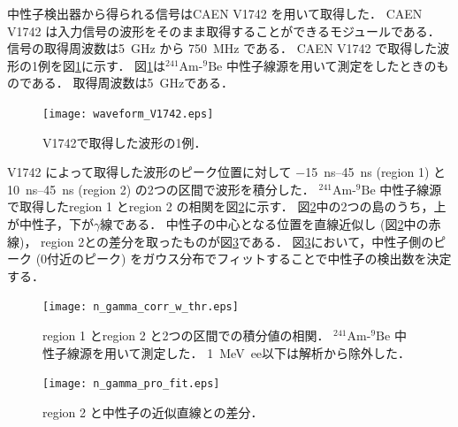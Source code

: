 \documentclass[../master]{subfiles}
\begin{document}
中性子検出器から得られる信号はCAEN V1742 を用いて取得した．
CAEN V1742 は入力信号の波形をそのまま取得することができるモジュールである．
信号の取得周波数は\SI{5}{\giga\hertz} から \SI{750}{\mega\hertz} である．
CAEN V1742 で取得した波形の1例を図\ref{fig::waveform_V1742}に示す．
図\ref{fig::waveform_V1742}は${}^{241}\mathrm{Am}$-${}^{9}\mathrm{Be}$ 中性子線源を用いて測定をしたときのものである．
取得周波数は\SI{5}{\giga\hertz}である．
\begin{figure}
  \centering
  \texttt{[image: waveform\_V1742.eps]}
  \caption{V1742で取得した波形の1例．}
  \label{fig::waveform_V1742}
\end{figure}

V1742 によって取得した波形のピーク位置に対して
\SIrange{-15}{45}{\nano\second} (region 1) と\SIrange{10}{45}{\nano\second} (region 2) の2つの区間で波形を積分した．
${}^{241}\mathrm{Am}$-${}^{9}\mathrm{Be}$ 中性子線源で取得したregion 1 とregion 2 の相関を図\ref{fig::n_gamma_correlation}に示す．
図\ref{fig::n_gamma_correlation}中の2つの島のうち，上が中性子，下が$\gamma$線である．
中性子の中心となる位置を直線近似し (図\ref{fig::n_gamma_correlation}中の赤線)，
region 2との差分を取ったものが図\ref{fig::n_gamma_projection}である．
図\ref{fig::n_gamma_projection}において，中性子側のピーク (0付近のピーク)
をガウス分布でフィットすることで中性子の検出数を決定する．
\begin{figure}
  \centering
  \texttt{[image: n\_gamma\_corr\_w\_thr.eps]}
  \caption[region 1 とregion 2 と2つの区間での積分値の相関．]
          {region 1 とregion 2 と2つの区間での積分値の相関．
            ${}^{241}\mathrm{Am}$-${}^{9}\mathrm{Be}$ 中性子線源を用いて測定した．
            \SI{1}{\mega\electronvolt ee}以下は解析から除外した．}
  \label{fig::n_gamma_correlation}
\end{figure}
\begin{figure}
  \centering
  \texttt{[image: n\_gamma\_pro\_fit.eps]}
  \caption{region 2 と中性子の近似直線との差分．}
  \label{fig::n_gamma_projection}
\end{figure}

\end{document}
